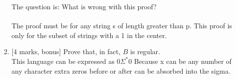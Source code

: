 \documentclass{article}
\begin{document}
\begin{enumerate}
\begin{enumerate}
                    The question is: What is wrong with this proof?\\
                    \\
                    The proof must be for any string s of length greater than p. This proof is only for the subset of strings with a 1 in the center.
                \item {[4 marks, bonus]} Prove that, in fact, $B$ is regular.\\
                This language can be expressed as $0\Sigma^*0$ Because x can be any number of any character extra zeros before or after can be absorbed into the sigma. 
            \end{enumerate}
\end{enumerate}
\end{document}
